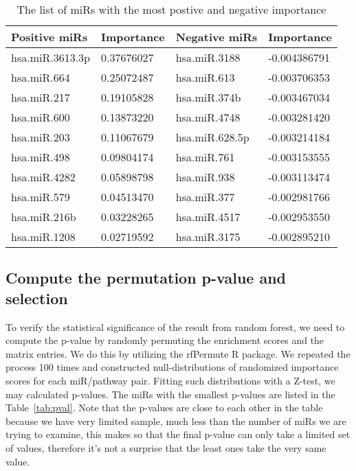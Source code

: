 \documentclass{scrartcl}
\numberwithin{figure}{section}
\numberwithin{table}{section}
\begin{document}
\begin{table}[h!]
  \centering
  \caption{The list of miRs with the most postive and negative importance}
  \label{tab:imp}
\bigskip
  \begin{tabular}{llll}
    \toprule
    Positive miRs   & Importance & Negative miRs  & Importance   \\
    \midrule
    hsa.miR.3613.3p & 0.37676027 & hsa.miR.3188   & -0.004386791 \\
    hsa.miR.664     & 0.25072487 & hsa.miR.613    & -0.003706353 \\
    hsa.miR.217     & 0.19105828 & hsa.miR.374b   & -0.003467034 \\
    hsa.miR.600     & 0.13873220 & hsa.miR.4748   & -0.003281420 \\
    hsa.miR.203     & 0.11067679 & hsa.miR.628.5p & -0.003214184 \\
    hsa.miR.498     & 0.09804174 & hsa.miR.761    & -0.003153555 \\
    hsa.miR.4282    & 0.05898798 & hsa.miR.938    & -0.003113474 \\
    hsa.miR.579     & 0.04513470 & hsa.miR.377    & -0.002981766 \\
    hsa.miR.216b    & 0.03228265 & hsa.miR.4517   & -0.002953550 \\
    hsa.miR.1208    & 0.02719592 & hsa.miR.3175   & -0.002895210 \\
    \bottomrule
  \end{tabular}
\end{table}

\subsection{Compute the permutation p-value and selection}

To verify the statistical significance of the result from random forest,
we need to compute the p-value by randomly permuting the enrichment scores and
the matrix entries. We do this by utilizing the rfPermute R package.
We repeated the process 100 times and constructed null-distributions of
randomized importance scores for each miR/pathway pair. Fitting such distributions
with a Z-test, we may calculated p-values. The miRs with the smallest p-values
are listed in the Table~\ref{tab:pval}. Note that the p-values are close to
each other in the table because we have very limited sample, much less than
the number of miRs we are trying to examine, this makes so that the final p-value
can only take a limited set of values, therefore it's not a surprise that
the least ones take the very same value.
\end{document}
